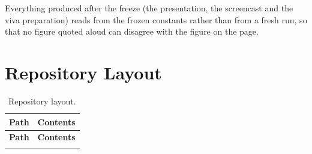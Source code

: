 Everything produced after the freeze (the presentation, the screencast and
the viva preparation) reads from the frozen constants rather than from a
fresh run, so that no figure quoted aloud can disagree with the figure on the
page.

\section{Repository Layout}

{\small
\begin{longtable}{p{4.6cm}p{8.4cm}}
    \caption{Repository layout.}\label{tab:repo_layout}\\
    \toprule
    \textbf{Path} & \textbf{Contents} \\
    \midrule
    \endfirsthead
    \toprule
    \textbf{Path} & \textbf{Contents} \\
    \midrule
    \endhead
    \bottomrule
    \endfoot


\end{longtable}}
